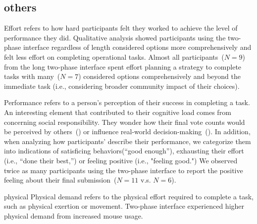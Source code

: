 


\subsection {others}
Effort refers to how hard participants felt they worked to achieve the level of performance they did. Qualitative analysis showed participants using the two-phase interface regardless of length considered options more comprehensively and felt less effort on completing operational tasks. Almost all participants~($N=9$) from the long two-phase interface spent effort planning a strategy to complete tasks with many~($N=7$) considered options comprehensively and beyond the immediate task (i.e., considering broader community impact of their choices). 

Performance refers to a person's perception of their success in completing a task. An interesting element that contributed to their cognitive load comes from concerning social responsibility. They wonder how their final vote counts would be perceived by others~() or influence real-world decision-making~(). In addition, when analyzing how participants' describe their performance, we categorize them into indications of satisficing behaviors(``good enough''), exhausting their effort (i.e., ``done their best,'') or feeling positive (i.e., "feeling good.") We observed twice as many participants using the two-phase interface to report the positive feeling about their final submission~($N=11$ v.s. $N=6$).

physical
Physical demand refers to the physical effort required to complete a task, such as physical exertion or movement. Two-phase interface experienced higher physical demand from increased mouse usage.

